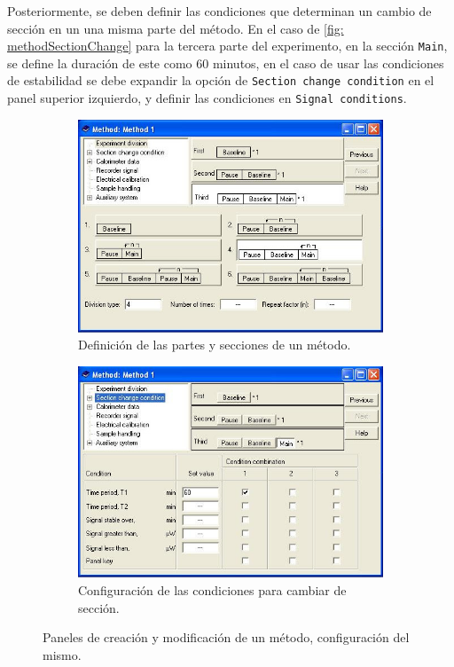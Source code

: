 	Posteriormente, se deben definir las condiciones que determinan un cambio de secci\'on en un una misma parte del m\'etodo. En el caso de \autoref{fig: methodSectionChange} para la tercera parte del experimento, en la secci\'on \texttt{Main}, se define la duraci\'on de este como 60 minutos, en el caso de usar las condiciones de estabilidad se debe expandir la opci\'on de \texttt{Section change condition} en el panel superior izquierdo, y definir las condiciones en \texttt{Signal conditions}.
	\begin{figure}[h]
		\centering
		\begin{subfigure}{0.45\linewidth}
			\includegraphics[width=\linewidth]{Figures/digitamMethod}
			\caption{Definici\'on de las partes y secciones de un m\'etodo.}
			\label{fig: methodCreation}
		\end{subfigure}
		\begin{subfigure}{0.45\linewidth}
			\includegraphics[width=\linewidth]{Figures/digitamMethod2}
			\caption{Configuraci\'on de las condiciones para cambiar de secci\'on.}
			\label{fig: methodSectionChange}
		\end{subfigure}
		\caption{Paneles de creaci\'on y modificaci\'on de un m\'etodo, configuraci\'on del mismo.}
		\label{fig: methodPanel}
	\end{figure}
	
